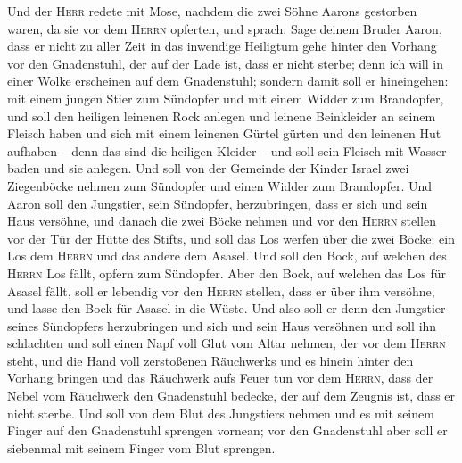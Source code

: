  Und der \textsc{Herr} redete mit Mose, nachdem die zwei
Söhne Aarons gestorben waren, da sie vor dem \textsc{Herrn} opferten,
 und sprach: Sage deinem Bruder Aaron, dass er nicht zu
aller Zeit in das inwendige Heiligtum gehe hinter den Vorhang vor den
Gnadenstuhl, der auf der Lade ist, dass er nicht sterbe; denn ich will
in einer Wolke erscheinen auf dem Gnadenstuhl;  sondern
damit soll er hineingehen: mit einem jungen Stier zum Sündopfer und mit
einem Widder zum Brandopfer,  und soll den heiligen
leinenen Rock anlegen und leinene Beinkleider an seinem Fleisch haben
und sich mit einem leinenen Gürtel gürten und den leinenen Hut aufhaben
-- denn das sind die heiligen Kleider -- und soll sein Fleisch mit
Wasser baden und sie anlegen.  Und soll von der Gemeinde
der Kinder Israel zwei Ziegenböcke nehmen zum Sündopfer und einen Widder
zum Brandopfer.  Und Aaron soll den Jungstier, sein
Sündopfer, herzubringen, dass er sich und sein Haus versöhne,
 und danach die zwei Böcke nehmen und vor den
\textsc{Herrn} stellen vor der Tür der Hütte des Stifts, 
und soll das Los werfen über die zwei Böcke: ein Los dem \textsc{Herrn}
und das andere dem Asasel.  Und soll den Bock, auf welchen
des \textsc{Herrn} Los fällt, opfern zum Sündopfer.  Aber
den Bock, auf welchen das Los für Asasel fällt, soll er lebendig vor den
\textsc{Herrn} stellen, dass er über ihm versöhne, und lasse den Bock
für Asasel in die Wüste.  Und also soll er denn den
Jungstier seines Sündopfers herzubringen und sich und sein Haus
versöhnen und soll ihn schlachten  und soll einen Napf
voll Glut vom Altar nehmen, der vor dem \textsc{Herrn} steht, und die
Hand voll zerstoßenen Räuchwerks und es hinein hinter den Vorhang
bringen  und das Räuchwerk aufs Feuer tun vor dem
\textsc{Herrn}, dass der Nebel vom Räuchwerk den Gnadenstuhl bedecke,
der auf dem Zeugnis ist, dass er nicht sterbe.  Und soll
von dem Blut des Jungstiers nehmen und es mit seinem Finger auf den
Gnadenstuhl sprengen vornean; vor den Gnadenstuhl aber soll er siebenmal
mit seinem Finger vom Blut sprengen.

